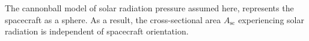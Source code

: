 \documentclass[12pt,letterpaper]{article}
\newcommand{\rsc}{r_{\scriptscriptstyle\text{sc}}}
\newcommand{\rE}{r_{\scriptscriptstyle\text{E}}}
\newcommand{\vE}{v_{\scriptscriptstyle \text{E}}}
\newcommand{\thteq}{\theta_{\text{eq}}}
\newcommand{\Asc}{A_{\scriptscriptstyle\text{sc}}}
\begin{document}
The cannonball model of solar radiation pressure assumed here, represents the spacecraft as a sphere. As a result, the cross-sectional area $\Asc$ experiencing solar radiation is independent of spacecraft orientation.

\end{document}
